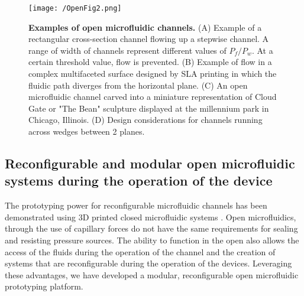 \begin{figure}[h!] %
\centering
\texttt{[image: /OpenFig2.png]}
\caption[\textbf{Examples of open microfluidic channels}]{\textbf{Examples of open microfluidic channels.} (A) Example of a rectangular cross-section channel flowing up a stepwise channel. A range of width of channels represent different values of $P_f/P_w$. At a certain threshold value, flow is prevented. (B) Example of flow in a complex multifaceted surface designed by SLA printing in which the fluidic path diverges from the horizontal plane. (C) An open microfluidic channel carved into a miniature representation of Cloud Gate or "The Bean" sculpture displayed at the millennium park in Chicago, Illinois. (D) Design considerations for channels running across wedges between 2 planes.}
\label{figure:OpenFig2}
\end{figure}



\subsection{Reconfigurable and modular open microfluidic systems during the operation of the device}

The prototyping power for reconfigurable microfluidic channels has been demonstrated using 3D printed closed microfluidic systems \cite{Bhargava2014}. Open microfluidics, through the use of capillary forces do not have the same requirements for sealing and resisting pressure sources. The ability to function in the open also allows the access of the fluids during the operation of the channel and the creation of systems that are reconfigurable during the operation of the devices. Leveraging these advantages, we have developed a modular, reconfigurable open microfluidic prototyping platform.

